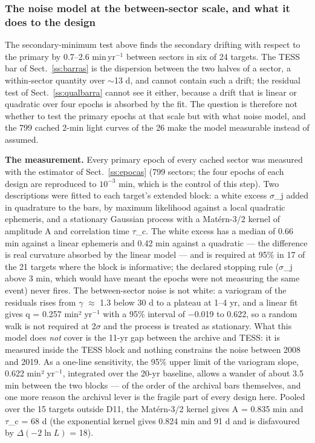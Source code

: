 \documentclass{aa}
\begin{document}
\subsubsection{The noise model at the between-sector scale, and what it does to the design}\label{sss:teto}
The secondary-minimum test above finds the secondary drifting with respect to the primary by 0.7--2.6 min\,yr$^{-1}$ between sectors in six of 24 targets. The TESS bar of Sect.~\ref{ss:barras} is the dispersion between the two halves of a sector, a within-sector quantity over $\sim$13 d, and cannot contain such a drift; the residual test of Sect.~\ref{ss:qualbarra} cannot see it either, because a drift that is linear or quadratic over four epochs is absorbed by the fit. The question is therefore not whether to test the primary epochs at that scale but with what noise model, and the 799 cached 2-min light curves of the 26 make the model measurable instead of assumed.

\textbf{The measurement.} Every primary epoch of every cached sector was measured with the estimator of Sect.~\ref{ss:epocas} (799 sectors; the four epochs of each design are reproduced to $10^{-3}$ min, which is the control of this step). Two descriptions were fitted to each target's extended block: a white excess $\sigma$\_j added in quadrature to the bars, by maximum likelihood against a local quadratic ephemeris, and a stationary Gaussian process with a Matérn-3/2 kernel of amplitude A and correlation time $\tau$\_c. The white excess has a median of 0.66 min against a linear ephemeris and 0.42 min against a quadratic --- the difference is real curvature absorbed by the linear model --- and is required at 95\% in 17 of the 21 targets where the block is informative; the declared stopping rule ($\sigma$\_j above 3 min, which would have meant the epochs were not measuring the same event) never fires. The between-sector noise is not white: a variogram of the residuals rises from $\gamma$ $\approx$ 1.3 below 30 d to a plateau at 1--4 yr, and a linear fit gives q = 0.257 min² yr$^{-1}$ with a 95\% interval of $-$0.019 to 0.622, so a random walk is not required at 2$\sigma$ and the process is treated as stationary. What this model does \textit{not} cover is the 11-yr gap between the archive and TESS: it is measured inside the TESS block and nothing constrains the noise between 2008 and 2019. As a one-line sensitivity, the 95\% upper limit of the variogram slope, 0.622 min² yr$^{-1}$, integrated over the 20-yr baseline, allows a wander of about 3.5 min between the two blocks --- of the order of the archival bars themselves, and one more reason the archival lever is the fragile part of every design here. Pooled over the 15 targets outside D11, the Matérn-3/2 kernel gives A = 0.835 min and $\tau$\_c = 68 d (the exponential kernel gives 0.824 min and 91 d and is disfavoured by $\Delta(-2\ln L)$ = 18).
\end{document}
